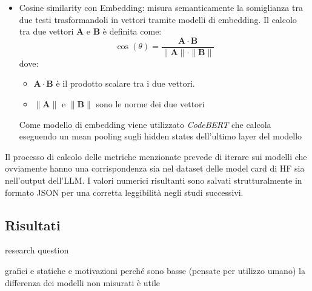 \documentclass{article}
\begin{document}
\begin{itemize}
    \item Cosine similarity con Embedding: misura semanticamente la somiglianza tra due testi trasformandoli in vettori tramite modelli di embedding. Il calcolo tra due vettori $\mathbf{A}$ e $\mathbf{B}$ è definita come:
    \[
        \cos(\theta) = \frac{\mathbf{A} \cdot \mathbf{B}}{\|\mathbf{A}\| \cdot \|\mathbf{B}\|}
    \]
    dove:
    \begin{itemize}
        \item $\mathbf{A} \cdot \mathbf{B}$ è il prodotto scalare tra i due vettori.
        \item $\|\mathbf{A}\|$ e $\|\mathbf{B}\|$ sono le norme dei due vettori
    \end{itemize}
    Come modello di embedding viene utilizzato \textit{CodeBERT} che calcola eseguendo un mean pooling sugli hidden states dell’ultimo layer del modello
\end{itemize}
Il processo di calcolo delle metriche menzionate prevede di iterare sui modelli che ovviamente hanno una corrispondenza sia nel dataset delle model card di HF sia nell'output dell'LLM. I valori numerici risultanti sono salvati strutturalmente in formato JSON per una corretta leggibilità negli studi successivi.

\subsection{Risultati}
research question



grafici e statiche e motivazioni perché sono basse (pensate per utilizzo umano)
la differenza dei modelli non misurati è utile
\end{document}
